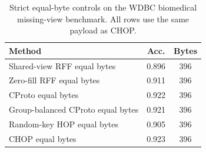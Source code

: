 \begin{table}[t]
\centering
\caption{Strict equal-byte controls on the WDBC biomedical missing-view benchmark. All rows use the same payload as CHOP.}
\label{tab:strict-equal-byte-wdbc}
\begin{tabular}{lcc}
\toprule
Method & Acc. & Bytes \\
\midrule
Shared-view RFF equal bytes & 0.896 & 396 \\
Zero-fill RFF equal bytes & 0.911 & 396 \\
CProto equal bytes & 0.922 & 396 \\
Group-balanced CProto equal bytes & 0.921 & 396 \\
Random-key HOP equal bytes & 0.905 & 396 \\
CHOP equal bytes & 0.923 & 396 \\
\bottomrule
\end{tabular}
\end{table}
